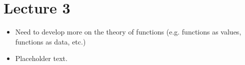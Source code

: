 \section*{Lecture 3}

\begin{itemize}
    \item Need to develop more on the theory of functions (e.g. functions as values, functions as data, etc.)
    \item Placeholder text.
\end{itemize}